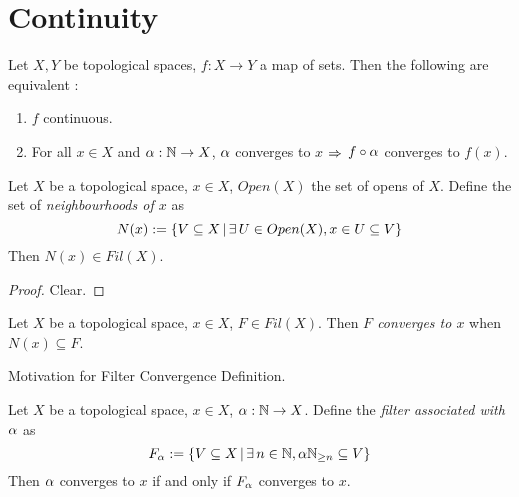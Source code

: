 \documentclass[main.tex]{subfiles}
\begin{document}
\section{Continuity}

\begin{rmk}
  
  Let $X, Y$ be topological spaces, $f : X \to Y$ a map of sets. 
  Then the following are equivalent : 
  \begin{enumerate}
    \item $f$ continuous. 
    \item For all $x \in X$ and $\alpha : \mathbb{N} \to X$,
    $\alpha$ converges to $x$ $\Rightarrow$
    $f \circ \alpha$ converges to $f(x)$.
  \end{enumerate}
\end{rmk}

\begin{prop} 
  
  Let $X$ be a topological space, $x \in X$, 
  $Open(X)$ the set of opens of $X$. \newline
  Define the set of \emph{neighbourhoods of $x$} as 
  \[N(x) := 
  \left\{V \subseteq X \,|\, \exists\,U \in Open(X), x \in U \subseteq V\right\}\]
  Then $N(x) \in Fil(X)$. 
\end{prop}
\begin{proof} 
  Clear.
\end{proof}

\begin{dfn} 
  
  Let $X$ be a topological space, $x \in X$, $F \in Fil(X)$.
  Then \emph{$F$ converges to $x$} when $N(x) \subseteq F$.
\end{dfn}

\begin{rmk} Motivation for Filter Convergence Definition. 
  
  Let $X$ be a topological space, $x \in X$,
  $\alpha : \mathbb{N} \to X$. 
  Define the \emph{filter associated with $\alpha$} as 
  \[F_\alpha := 
  \{V \subseteq X \,|\, \exists\, n \in \mathbb{N}, \alpha\mathbb{N}_{\geq n} \subseteq V\}\]
  Then $\alpha$ converges to $x$ if and only if $F_\alpha$ converges to $x$.
\end{rmk}
\end{document}
